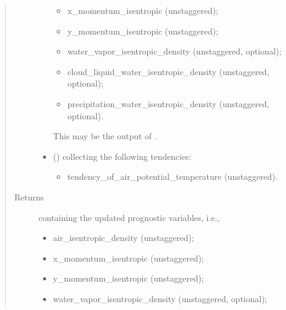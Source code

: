 \documentclass[letterpaper,10pt,english]{sphinxmanual}
\begin{document}
\begin{fulllineitems}
\begin{fulllineitems}
\begin{quote}
\begin{description}
\begin{itemize}
\begin{itemize}
\item {} 
x\_momentum\_isentropic (unstaggered);

\item {} 
y\_momentum\_isentropic (unstaggered);

\item {} 
water\_vapor\_isentropic\_density (unstaggered, optional);

\item {} 
cloud\_liquid\_water\_isentropic\_density (unstaggered, optional);

\item {} 
precipitation\_water\_isentropic\_density (unstaggered, optional).

\end{itemize}

This may be the output of
{\hyperref[\detokenize{api:dycore.prognostic_isentropic.PrognosticIsentropic.step_neglecting_vertical_advection}]{}}.


\item {} 
 () \textendash{} 
{\hyperref[\detokenize{api:storages.grid_data.GridData}]{}} collecting the following tendencies:
\begin{itemize}
\item {} 
tendency\_of\_air\_potential\_temperature (unstaggered).

\end{itemize}


\end{itemize}

\item[{Returns}] \leavevmode

{\hyperref[\detokenize{api:storages.state_isentropic.StateIsentropic}]{}} containing the updated prognostic variables, i.e.,
\begin{itemize}
\item {} 
air\_isentropic\_density (unstaggered);

\item {} 
x\_momentum\_isentropic (unstaggered);

\item {} 
y\_momentum\_isentropic (unstaggered);

\item {} 
water\_vapor\_isentropic\_density (unstaggered, optional);


\end{itemize}
\end{description}
\end{quote}
\end{fulllineitems}
\end{fulllineitems}
\end{document}
